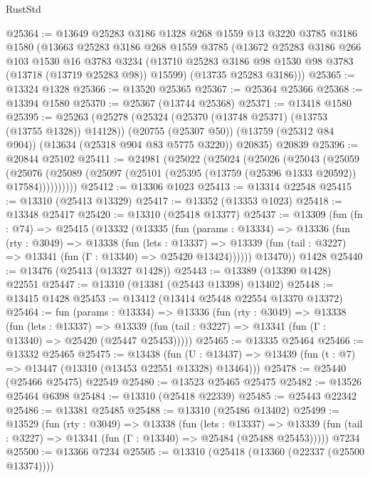 \begin{lexlean}{RustStd}
\begin{coremodule}
@25364 := @13649
    @25283
    @3186
    @1328
    @268
    @1559
    @13
    @3220
    @3785
    @3186
    @1580
    (@13663
      @25283
      @3186
      @268
      @1559
      @3785
      (@13672
        @25283
        @3186
        @266
        @103
        @1530
        @16
        @3783
        @3234
        (@13710 @25283 @3186 @98 @1530 @98 @3783 (@13718 (@13719 @25283 @98)) @15599)
        (@13735 @25283 @3186)))
@25365 := @13324 @1328
@25366 := @13520 @25365
@25367 := @25364 @25366
@25368 := @13394 @1580
@25370 := @25367 (@13744 @25368)
@25371 := @13418 @1580
@25395 := @25263
    (@25278
      (@25324 (@25370 (@13748 @25371) (@13753 (@13755 @1328)) @14128))
      (@20755 (@25307 @50))
      (@13759 (@25312 @84 @904))
      (@13634 (@25318 @904 @83 @5775 @3220))
      @20835)
    @20839
@25396 := @20844 @25102
@25411 := @24981
    (@25022
      (@25024
        (@25026
          (@25043
            (@25059
              (@25076
                (@25089 (@25097 (@25101 (@25395 (@13759 (@25396 @1333 @20592)) @17584))))))))))
@25412 := @13306 @1023
@25413 := @13314 @22548
@25415 := @13310 (@25413 @13329)
@25417 := @13352 (@13353 @1023)
@25418 := @13348 @25417
@25420 := @13310 (@25418 @13377)
@25437 := @13309
    (fun (fn : @74) =>
    @25415
      (@13332
        (@13335
          (fun (params : @13334) =>
          @13336
            (fun (rty : @3049) =>
            @13338
              (fun (lets : @13337) =>
              @13339 (fun (tail : @3227) => @13341 (fun (Γ : @13340) => @25420 @13424))))))
        @13470))
    @1428
@25440 := @13476 (@25413 (@13327 @1428))
@25443 := @13389 (@13390 @1428) @22551
@25447 := @13310 (@13381 (@25443 @13398) @13402)
@25448 := @13415 @1428
@25453 := @13412 (@13414 @25448 @22554 @13370 @13372)
@25464 := fun (params : @13334) =>
  @13336
    (fun (rty : @3049) =>
    @13338
      (fun (lets : @13337) =>
      @13339 (fun (tail : @3227) => @13341 (fun (Γ : @13340) => @25420 (@25447 @25453)))))
@25465 := @13335 @25464
@25466 := @13332 @25465
@25475 := @13438
    (fun (U : @13437) => @13439 (fun (t : @7) => @13447 (@13310 (@13453 @22551 @13328) @13464)))
@25478 := @25440 (@25466 @25475) @22549
@25480 := @13523 @25465 @25475
@25482 := @13526 @25464 @6398
@25484 := @13310 (@25418 @22339)
@25485 := @25443 @22342
@25486 := @13381 @25485
@25488 := @13310 (@25486 @13402)
@25499 := @13529
    (fun (rty : @3049) =>
    @13338
      (fun (lets : @13337) =>
      @13339 (fun (tail : @3227) => @13341 (fun (Γ : @13340) => @25484 (@25488 @25453)))))
    @7234
@25500 := @13366 @7234
@25505 := @13310 (@25418 (@13360 (@22337 (@25500 @13374))))

\end{coremodule}
\end{lexlean}

